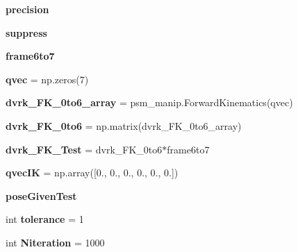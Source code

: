 \begin{DoxyCompactItemize}
\item 
{\bfseries precision}\hypertarget{namespacecisstPythonTest_a464d1e7e9c9a4bcb74f6d7212f4e5d20}{}\label{namespacecisstPythonTest_a464d1e7e9c9a4bcb74f6d7212f4e5d20}

\item 
{\bfseries suppress}\hypertarget{namespacecisstPythonTest_a28565b4fda2d9a7c95fab86bbeed4ba7}{}\label{namespacecisstPythonTest_a28565b4fda2d9a7c95fab86bbeed4ba7}

\item 
{\bfseries frame6to7}
\item 
{\bfseries qvec} = np.\+zeros(7)\hypertarget{namespacecisstPythonTest_a26dd2bc036fe66656f5a36908390ab73}{}\label{namespacecisstPythonTest_a26dd2bc036fe66656f5a36908390ab73}

\item 
{\bfseries dvrk\+\_\+\+F\+K\+\_\+0to6\+\_\+array} = psm\+\_\+manip.\+Forward\+Kinematics(qvec)\hypertarget{namespacecisstPythonTest_a70be031122b8bcbb50b0aede95cc1bf6}{}\label{namespacecisstPythonTest_a70be031122b8bcbb50b0aede95cc1bf6}

\item 
{\bfseries dvrk\+\_\+\+F\+K\+\_\+0to6} = np.\+matrix(dvrk\+\_\+\+F\+K\+\_\+0to6\+\_\+array)\hypertarget{namespacecisstPythonTest_a9f1e567c5c400f4bccd891b3dc536193}{}\label{namespacecisstPythonTest_a9f1e567c5c400f4bccd891b3dc536193}

\item 
{\bfseries dvrk\+\_\+\+F\+K\+\_\+\+Test} = dvrk\+\_\+\+F\+K\+\_\+0to6$\ast$frame6to7\hypertarget{namespacecisstPythonTest_aa7da43fe6d350f83a2f6bcdd9074316d}{}\label{namespacecisstPythonTest_aa7da43fe6d350f83a2f6bcdd9074316d}

\item 
{\bfseries qvec\+IK} = np.\+array(\mbox{[}0., 0., 0., 0., 0., 0.\mbox{]})\hypertarget{namespacecisstPythonTest_a320300c613d757afbe8ef357d1a0acd8}{}\label{namespacecisstPythonTest_a320300c613d757afbe8ef357d1a0acd8}

\item 
{\bfseries pose\+Given\+Test}
\item 
int {\bfseries tolerance} = 1\hypertarget{namespacecisstPythonTest_a496b82e37ced773d99480e4b5c28e2d5}{}\label{namespacecisstPythonTest_a496b82e37ced773d99480e4b5c28e2d5}

\item 
int {\bfseries Niteration} = 1000\hypertarget{namespacecisstPythonTest_ad15bca3c4e68e2732eafdb645d87522f}{}\label{namespacecisstPythonTest_ad15bca3c4e68e2732eafdb645d87522f}


\end{DoxyCompactItemize}
